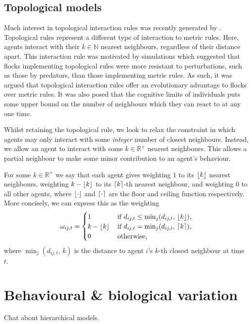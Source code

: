 \subsection{Topological models}

Much interest in topological interaction rules was recently generated by
\cite{ballerini08}. Topological rules represent a different type of interaction to metric
rules. Here, agents interact with their $k\in\mathbb{N}$ nearest neighbours, regardless of
their distance apart. This interaction rule was motivated by simulations which suggested
that flocks implementing topological rules were more resistant to perturbations, such as
those by predators, than those implementing metric rules. As such, it was argued that
topological interaction rules offer an evolutionary advantage to flocks over metric rules.
It was also posed that the cognitive limits of individuals puts some upper bound on the
number of neighbours which they can react to at any one time.

Whilst retaining the topological rule, we look to relax the constraint in which agents may
only interact with some \emph{integer} number of closest neighbours. Instead, we 
allow an agent to interact with some $k\in\mathbb{R}^+$ nearest neighbours. This allows a
partial neighbour to make some minor contribution to an agent's behaviour.

For some $k\in\mathbb{R}^+$ we say that each agent gives weighting $1$ to its $\lfloor k\rfloor$
nearest neighbours, weighting $k - \lfloor k\rfloor$ to its $\lceil k\rceil$-th nearest neighbour, and
weighting $0$ to all other agents, where $\lfloor\cdot\rfloor$ and $\lceil\cdot\rceil$ are the floor
and ceiling function respectively. More concisely, we can express this as the weighting
\begin{equation}
	\omega_{ij,t} =
	\begin{cases}
		1           & \, \text{if } d_{ij, t} \leq \min_j(d_{ij,t},\, \lfloor k\rfloor), \\
		k-\lfloor k\rfloor & \, \text{if } d_{ij, t} = \min_j(d_{ij,t},\, \lceil k\rceil),     \\
		0           & \, \text{otherwise,}
	\end{cases}
\end{equation}
where $\min_j(d_{ij,t},\, k)$ is the distance to agent $i$'s $k$-th closest neighbour at
time $t$. 

\section{Behavioural \& biological variation}

Chat about hierarchical models.

